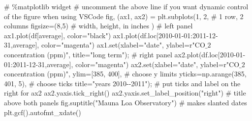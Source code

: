 \documentclass[
  letterpaper,
  DIV=11,
  numbers=noendperiod]{scrreprt}
\newenvironment{Shaded}{\begin{snugshade}}{\end{snugshade}}
\newcommand{\BuiltInTok}[1]{\textcolor[rgb]{0.00,0.23,0.31}{#1}}
\newcommand{\CommentTok}[1]{\textcolor[rgb]{0.37,0.37,0.37}{#1}}
\newcommand{\DecValTok}[1]{\textcolor[rgb]{0.68,0.00,0.00}{#1}}
\newcommand{\NormalTok}[1]{\textcolor[rgb]{0.00,0.23,0.31}{#1}}
\newcommand{\OperatorTok}[1]{\textcolor[rgb]{0.37,0.37,0.37}{#1}}
\newcommand{\StringTok}[1]{\textcolor[rgb]{0.13,0.47,0.30}{#1}}
\newcommand{\VerbatimStringTok}[1]{\textcolor[rgb]{0.13,0.47,0.30}{#1}}
\begin{document}
\begin{Shaded}
\begin{Highlighting}[]
\CommentTok{\# \%matplotlib widget}
\CommentTok{\# uncomment the above line if you want dynamic control of the figure when using VSCode}
\NormalTok{fig, (ax1, ax2) }\OperatorTok{=}\NormalTok{ plt.subplots(}\DecValTok{1}\NormalTok{, }\DecValTok{2}\NormalTok{,  }\CommentTok{\# 1 row, 2 columns}
\NormalTok{                               figsize}\OperatorTok{=}\NormalTok{(}\DecValTok{8}\NormalTok{,}\DecValTok{5}\NormalTok{)  }\CommentTok{\# width, height, in inches}
\NormalTok{                               )}
\CommentTok{\# left panel}
\NormalTok{ax1.plot(df[}\StringTok{\textquotesingle{}average\textquotesingle{}}\NormalTok{], color}\OperatorTok{=}\StringTok{"black"}\NormalTok{)}
\NormalTok{ax1.plot(df.loc[}\StringTok{\textquotesingle{}2010{-}01{-}01\textquotesingle{}}\NormalTok{:}\StringTok{\textquotesingle{}2011{-}12{-}31\textquotesingle{}}\NormalTok{,}\StringTok{\textquotesingle{}average\textquotesingle{}}\NormalTok{], color}\OperatorTok{=}\StringTok{"magenta"}\NormalTok{)}
\NormalTok{ax1.}\BuiltInTok{set}\NormalTok{(xlabel}\OperatorTok{=}\StringTok{"date"}\NormalTok{,}
\NormalTok{       ylabel}\OperatorTok{=}\VerbatimStringTok{r"CO$\_2$ concentration (ppm)"}\NormalTok{,}
\NormalTok{       title}\OperatorTok{=}\StringTok{"long term"}\NormalTok{)}\OperatorTok{;}
\CommentTok{\# right panel}
\NormalTok{ax2.plot(df.loc[}\StringTok{\textquotesingle{}2010{-}01{-}01\textquotesingle{}}\NormalTok{:}\StringTok{\textquotesingle{}2011{-}12{-}31\textquotesingle{}}\NormalTok{,}\StringTok{\textquotesingle{}average\textquotesingle{}}\NormalTok{], color}\OperatorTok{=}\StringTok{"magenta"}\NormalTok{)}
\NormalTok{ax2.}\BuiltInTok{set}\NormalTok{(xlabel}\OperatorTok{=}\StringTok{"date"}\NormalTok{,}
\NormalTok{        ylabel}\OperatorTok{=}\VerbatimStringTok{r"CO$\_2$ concentration (ppm)"}\NormalTok{,}
\NormalTok{        ylim}\OperatorTok{=}\NormalTok{[}\DecValTok{385}\NormalTok{, }\DecValTok{400}\NormalTok{],  }\CommentTok{\# choose y limits}
\NormalTok{        yticks}\OperatorTok{=}\NormalTok{np.arange(}\DecValTok{385}\NormalTok{, }\DecValTok{401}\NormalTok{, }\DecValTok{5}\NormalTok{),  }\CommentTok{\# choose ticks}
\NormalTok{        title}\OperatorTok{=}\StringTok{"years 2010{-}{-}2011"}\NormalTok{)}\OperatorTok{;}
\CommentTok{\# put ticks and label on the right for ax2}
\NormalTok{ax2.yaxis.tick\_right()}
\NormalTok{ax2.yaxis.set\_label\_position(}\StringTok{"right"}\NormalTok{)}
\CommentTok{\# title above both panels}
\NormalTok{fig.suptitle(}\StringTok{"Mauna Loa Observatory"}\NormalTok{)}
\CommentTok{\# makes slanted dates}
\NormalTok{plt.gcf().autofmt\_xdate()}
\end{Highlighting}
\end{Shaded}
\end{document}
